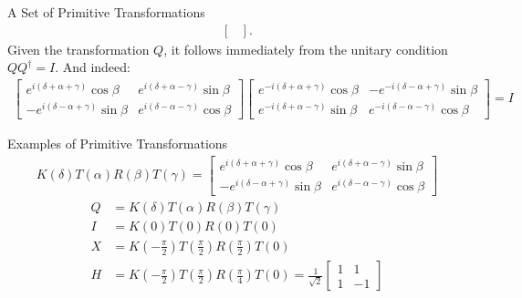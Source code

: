 \documentclass{beamer}
\begin{document}
\begin{frame}{A Set of Primitive Transformations}
{\begin{align*}
\begin{bmatrix}
       \end{bmatrix}.
    \end{align*}
    Given the transformation $Q$, it follows immediately from the unitary condition $QQ^{\dagger}=I$.
    And indeed:
    \begin{align*}
      \begin{bmatrix}
         e^{i(\delta + \alpha + \gamma)} \cos\beta & e^{i(\delta + \alpha - \gamma)} \sin\beta \\
        -e^{i(\delta - \alpha + \gamma)} \sin\beta & e^{i(\delta - \alpha - \gamma)} \cos\beta
      \end{bmatrix}
      \begin{bmatrix}
        e^{-i(\delta + \alpha + \gamma)} \cos\beta & -e^{-i(\delta - \alpha + \gamma)} \sin\beta \\
        e^{-i(\delta + \alpha - \gamma)} \sin\beta &  e^{-i(\delta - \alpha - \gamma)} \cos\beta
      \end{bmatrix} = I
    \end{align*}
  }%
\end{frame}


\begin{frame}{Examples of Primitive Transformations}
  {\tiny
    \begin{align*}
      K(\delta)T(\alpha)R(\beta)T(\gamma) =
       \begin{bmatrix}
          e^{i(\delta + \alpha + \gamma)} \cos\beta & e^{i(\delta + \alpha - \gamma)} \sin\beta \\
         -e^{i(\delta - \alpha + \gamma)} \sin\beta & e^{i(\delta - \alpha - \gamma)} \cos\beta
       \end{bmatrix}
    \end{align*}
    \begin{align*}
      Q &= K(\delta)T(\alpha)R(\beta)T(\gamma) \\
      I &= K(0) T(0) R(0) T(0) \\
      X &= K(-\frac{\pi}{2}) T(\frac{\pi}{2}) R(\frac{\pi}{2}) T(0) \\
      H &= K(-\frac{\pi}{2}) T(\frac{\pi}{2}) R(\frac{\pi}{4}) T(0) = \frac{1}{\sqrt{2}}\begin{bmatrix} 1 & 1 \\ 1 & -1\end{bmatrix}
    \end{align*}
  }%
\end{frame}
\end{document}
